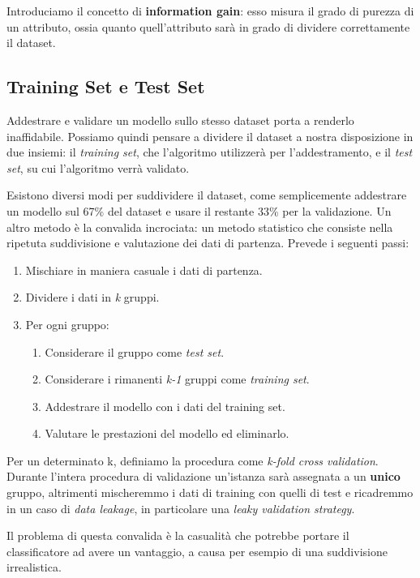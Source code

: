        Introduciamo il concetto di \textbf{information gain}: esso misura il grado di purezza di un attributo, ossia quanto quell'attributo sarà in grado di dividere correttamente il dataset.
        
    \subsection{Training Set e Test Set}
        Addestrare e validare un modello sullo stesso dataset porta a renderlo inaffidabile. Possiamo quindi pensare a dividere il dataset a nostra disposizione in due insiemi: il \textit{training set}, che l'algoritmo utilizzerà per l'addestramento, e il \textit{test set}, su cui l'algoritmo verrà validato.
        
        Esistono diversi modi per suddividere il dataset, come semplicemente addestrare un modello sul 67\% del dataset e usare il restante 33\% per la validazione. Un altro metodo è la convalida incrociata: un metodo statistico che consiste nella ripetuta suddivisione e valutazione dei dati di partenza. Prevede i seguenti passi:
        \begin{enumerate}
            \item Mischiare in maniera casuale i dati di partenza.
            \item Dividere i dati in \textit{k} gruppi.
            \item Per ogni gruppo: \begin{enumerate}
                \item Considerare il gruppo come \textit{test set}.
                \item Considerare i rimanenti \textit{k-1} gruppi come \textit{training set}.
                \item Addestrare il modello con i dati del training set.
                \item Valutare le prestazioni del modello ed eliminarlo.
            \end{enumerate}
        \end{enumerate}
        
        Per un determinato k, definiamo la procedura come \textit{k-fold cross validation}. Durante l'intera procedura di validazione un'istanza sarà assegnata a un \textbf{unico} gruppo, altrimenti mischeremmo i dati di training con quelli di test e ricadremmo in un caso di \textit{data leakage}, in particolare una \textit{leaky validation strategy}.
        
        Il problema di questa convalida è la casualità che potrebbe portare il classificatore ad avere un vantaggio, a causa per esempio di una suddivisione irrealistica.
        

